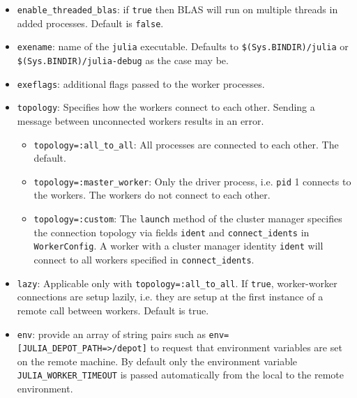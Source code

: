 \begin{adjustwidth}{2em}{0pt}
\begin{itemize}
\item \texttt{enable\_threaded\_blas}: if \texttt{true} then  BLAS will run on multiple threads in added processes. Default is \texttt{false}.


\item \texttt{exename}: name of the \texttt{julia} executable. Defaults to \texttt{{\textquotedbl}\$(Sys.BINDIR)/julia{\textquotedbl}} or \texttt{{\textquotedbl}\$(Sys.BINDIR)/julia-debug{\textquotedbl}} as the case may be.


\item \texttt{exeflags}: additional flags passed to the worker processes.


\item \texttt{topology}: Specifies how the workers connect to each other. Sending a message between unconnected workers results in an error.

\begin{itemize}
\item \texttt{topology=:all\_to\_all}: All processes are connected to each other. The default.


\item \texttt{topology=:master\_worker}: Only the driver process, i.e. \texttt{pid} 1 connects to the workers. The workers do not connect to each other.


\item \texttt{topology=:custom}: The \texttt{launch} method of the cluster manager specifies the connection topology via fields \texttt{ident} and \texttt{connect\_idents} in \texttt{WorkerConfig}. A worker with a cluster manager identity \texttt{ident} will connect to all workers specified in \texttt{connect\_idents}.

\end{itemize}

\item \texttt{lazy}: Applicable only with \texttt{topology=:all\_to\_all}. If \texttt{true}, worker-worker connections are setup lazily, i.e. they are setup at the first instance of a remote call between workers. Default is true.


\item \texttt{env}: provide an array of string pairs such as \texttt{env=[{\textquotedbl}JULIA\_DEPOT\_PATH{\textquotedbl}=>{\textquotedbl}/depot{\textquotedbl}]} to request that environment variables are set on the remote machine. By default only the environment variable \texttt{JULIA\_WORKER\_TIMEOUT} is passed automatically from the local to the remote environment.



\end{itemize}
\end{adjustwidth}
